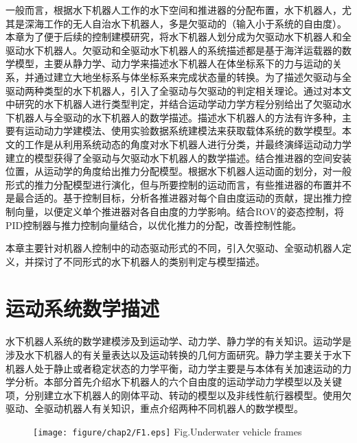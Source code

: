 一般而言，根据水下机器人工作的水下空间和推进器的分配布置，水下机器人，尤其是深海工作的无人自治水下机器人，多是欠驱动的（输入小于系统的自由度）。本章为了便于后续的控制建模研究，将水下机器人划分成为欠驱动水下机器人和全驱动水下机器人。欠驱动和全驱动水下机器人的系统描述都是基于海洋运载器的数学模型，主要从静力学、动力学来描述水下机器人在体坐标系下的力与运动的关系，并通过建立大地坐标系与体坐标系来完成状态量的转换。为了描述欠驱动与全驱动两种类型的水下机器人，引入了全驱动与欠驱动的判定相关理论。通过对本文中研究的水下机器人进行类型判定，并结合运动学动力学方程分别给出了欠驱动水下机器人与全驱动的水下机器人的数学描述。描述水下机器人的方法有许多种，主要有运动动力学建模法、使用实验数据系统建模法来获取载体系统的数学模型。本文的工作是从利用系统动态的角度对水下机器人进行分类，并最终演绎运动动力学建立的模型获得了全驱动与欠驱动水下机器人的数学描述。结合推进器的空间安装位置，从运动学的角度给出推力分配模型。根据水下机器人运动面的划分，对一般形式的推力分配模型进行演化，但与所要控制的运动而言，有些推进器的布置并不是最合适的。基于控制目标，分析各推进器对每个自由度运动的贡献，提出推力控制向量，以便定义单个推进器对各自由度的力学影响。结合ROV的姿态控制，将PID控制器与推力控制向量结合，以优化推力的分配，改善控制性能。

本章主要针对机器人控制中的动态驱动形式的不同，引入欠驱动、全驱动机器人定义，并探讨了不同形式的水下机器人的类别判定与模型描述。

\section{运动系统数学描述 }

水下机器人系统的数学建模涉及到运动学、动力学、静力学的有关知识。运动学是涉及水下机器人的有关量表达以及运动转换的几何方面研究。静力学主要关于水下机器人处于静止或者稳定状态的力学平衡，动力学主要是与本体有关加速运动的力学分析。本部分首先介绍水下机器人的六个自由度的运动学动力学模型以及关键项，分别建立水下机器人的刚体平动、转动的模型以及非线性航行器模型。使用欠驱动、全驱动机器人有关知识，重点介绍两种不同机器人的数学模型。

\begin{figure}[!htp]
\centering
\texttt{[image: figure/chap2/F1.eps]}
\label{fig:chap2:F1}
 {Fig.}{Underwater vehicle frames}
\end{figure}

